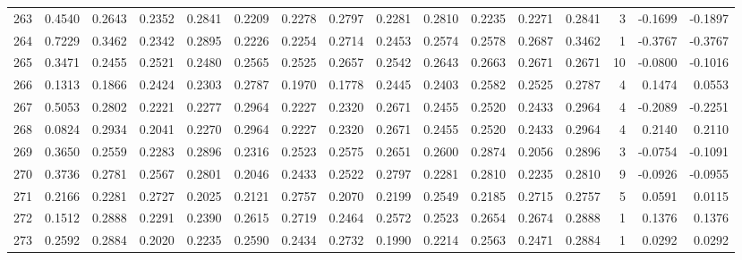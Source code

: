 \begin{tabular}{lrrrrrrrrrrrrrrr}
263 &      0.4540 &  0.2643 &  0.2352 &  0.2841 &  0.2209 &  0.2278 &  0.2797 &  0.2281 &  0.2810 &  0.2235 &   0.2271 &     0.2841 &      3 &                   -0.1699 &                    -0.1897 \\
264 &      0.7229 &  0.3462 &  0.2342 &  0.2895 &  0.2226 &  0.2254 &  0.2714 &  0.2453 &  0.2574 &  0.2578 &   0.2687 &     0.3462 &      1 &                   -0.3767 &                    -0.3767 \\
265 &      0.3471 &  0.2455 &  0.2521 &  0.2480 &  0.2565 &  0.2525 &  0.2657 &  0.2542 &  0.2643 &  0.2663 &   0.2671 &     0.2671 &     10 &                   -0.0800 &                    -0.1016 \\
266 &      0.1313 &  0.1866 &  0.2424 &  0.2303 &  0.2787 &  0.1970 &  0.1778 &  0.2445 &  0.2403 &  0.2582 &   0.2525 &     0.2787 &      4 &                    0.1474 &                     0.0553 \\
267 &      0.5053 &  0.2802 &  0.2221 &  0.2277 &  0.2964 &  0.2227 &  0.2320 &  0.2671 &  0.2455 &  0.2520 &   0.2433 &     0.2964 &      4 &                   -0.2089 &                    -0.2251 \\
268 &      0.0824 &  0.2934 &  0.2041 &  0.2270 &  0.2964 &  0.2227 &  0.2320 &  0.2671 &  0.2455 &  0.2520 &   0.2433 &     0.2964 &      4 &                    0.2140 &                     0.2110 \\
269 &      0.3650 &  0.2559 &  0.2283 &  0.2896 &  0.2316 &  0.2523 &  0.2575 &  0.2651 &  0.2600 &  0.2874 &   0.2056 &     0.2896 &      3 &                   -0.0754 &                    -0.1091 \\
270 &      0.3736 &  0.2781 &  0.2567 &  0.2801 &  0.2046 &  0.2433 &  0.2522 &  0.2797 &  0.2281 &  0.2810 &   0.2235 &     0.2810 &      9 &                   -0.0926 &                    -0.0955 \\
271 &      0.2166 &  0.2281 &  0.2727 &  0.2025 &  0.2121 &  0.2757 &  0.2070 &  0.2199 &  0.2549 &  0.2185 &   0.2715 &     0.2757 &      5 &                    0.0591 &                     0.0115 \\
272 &      0.1512 &  0.2888 &  0.2291 &  0.2390 &  0.2615 &  0.2719 &  0.2464 &  0.2572 &  0.2523 &  0.2654 &   0.2674 &     0.2888 &      1 &                    0.1376 &                     0.1376 \\
273 &      0.2592 &  0.2884 &  0.2020 &  0.2235 &  0.2590 &  0.2434 &  0.2732 &  0.1990 &  0.2214 &  0.2563 &   0.2471 &     0.2884 &      1 &                    0.0292 &                     0.0292 \\

\end{tabular}
